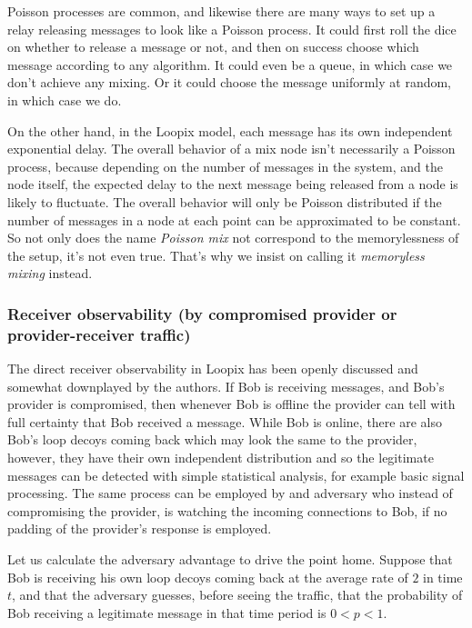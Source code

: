 \documentclass{article}
\begin{document}
Poisson processes are common, and likewise there are many ways to set up a relay releasing messages to look like a Poisson process. It could first roll the dice on whether to release a message or not, and then on success choose which message according to any algorithm. It could even be a queue, in which case we don't achieve any mixing. Or it could choose the message uniformly at random, in which case we do.

On the other hand, in the Loopix model, each message has its own independent exponential delay. The overall behavior of a mix node isn't necessarily a Poisson process, because depending on the number of messages in the system, and the node itself, the expected delay to the next message being released from a node is likely to fluctuate. The overall behavior will only be Poisson distributed if the number of messages in a node at each point can be approximated to be constant. So not only does the name \textit{Poisson mix} not correspond to the memorylessness of the setup, it's not even true. That's why we insist on calling it \textit{memoryless mixing} instead.


\subsubsection{Receiver observability (by compromised provider or provider-receiver traffic)}

The direct receiver observability in Loopix has been openly discussed and somewhat downplayed by the authors. If Bob is receiving messages, and Bob's provider is compromised, then whenever Bob is offline the provider can tell with full certainty that Bob received a message. While Bob is online, there are also Bob's loop decoys coming back which may look the same to the provider, however, they have their own independent distribution and so the legitimate messages can be detected with simple statistical analysis, for example basic signal processing. The same process can be employed by and adversary who instead of compromising the provider, is watching the incoming connections to Bob, if no padding of the provider's response is employed.

Let us calculate the adversary advantage to drive the point home. Suppose that Bob is receiving his own loop decoys coming back at the average rate of $2$ in time $t$, and that the adversary guesses, before seeing the traffic, that the probability of Bob receiving a legitimate message in that time period is $0<p<1$.
\end{document}
